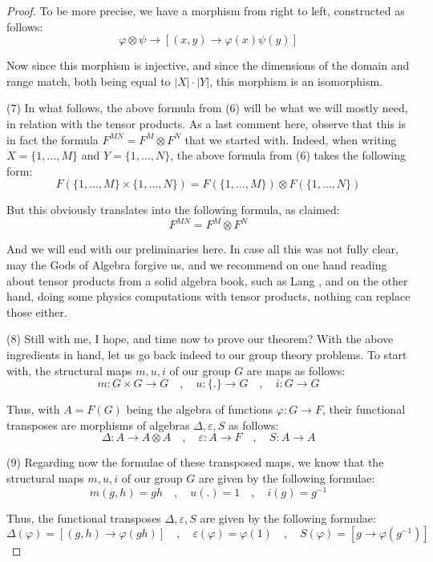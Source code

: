 \documentclass[12pt]{amsbook}
\begin{document}
\begin{proof}
To be more precise, we have a morphism from right to left, constructed as follows:
$$\varphi\otimes\psi\to[(x,y)\to\varphi(x)\psi(y)]$$

Now since this morphism is injective, and since the dimensions of the domain and range match, both being equal to $|X|\cdot|Y|$, this morphism is an isomorphism.

\medskip

(7) In what follows, the above formula from (6) will be what we will mostly need, in relation with the tensor products. As a last comment here, observe that this is in fact the formula $F^{MN}=F^M\otimes F^N$ that we started with. Indeed, when writing $X=\{1,\ldots,M\}$ and $Y=\{1,\ldots,N\}$, the above formula from (6) takes the following form:
$$F\left(\{1,\ldots,M\}\times\{1,\ldots,N\}\right)=F\left(\{1,\ldots,M\}\right)\otimes F\left(\{1,\ldots,N\}\right)$$

But this obviously translates into the following formula, as claimed:
$$F^{MN}=F^M\otimes F^N$$

And we will end with our preliminaries here. In case all this was not fully clear, may the Gods of Algebra forgive us, and we recommend on one hand reading about tensor products from a solid algebra book, such as Lang \cite{lng}, and on the other hand, doing some physics computations with tensor products, nothing can replace those either.

\medskip

(8) Still with me, I hope, and time now to prove our theorem? With the above ingredients in hand, let us go back indeed to our group theory problems. To start with, the structural maps $m,u,i$ of our group $G$ are maps as follows:
$$m:G\times G\to G\quad,\quad
u:\{.\}\to G\quad,\quad
i:G\to G$$

Thus, with $A=F(G)$ being the algebra of functions $\varphi:G\to F$, their functional transposes are morphisms of algebras $\Delta,\varepsilon,S$ as follows:
$$\Delta:A\to A\otimes A\quad,\quad 
\varepsilon:A\to F\quad,\quad 
S:A\to A$$

(9) Regarding now the formulae of these transposed maps, we know that the structural maps $m,u,i$ of our group $G$ are given by the following formulae:
$$m(g,h)=gh\quad,\quad 
u(.)=1\quad,\quad 
i(g)=g^{-1}$$

Thus, the functional transposes $\Delta,\varepsilon,S$ are given by the following formulae:
$$\Delta(\varphi)=[(g,h)\to \varphi(gh)]\quad,\quad
\varepsilon(\varphi)=\varphi(1)\quad,\quad
S(\varphi)=[g\to\varphi(g^{-1})]$$


\end{proof}
\end{document}
